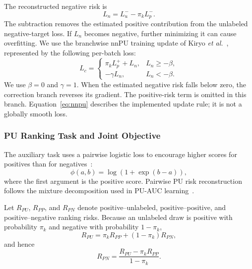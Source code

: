 \documentclass[lettersize,journal]{IEEEtran}
\begin{document}
The reconstructed negative risk is
\begin{equation}
L_n=L_u^- -\pi_kL_p^-.
\label{eq:negative-risk}
\end{equation}
The subtraction removes the estimated positive contribution from the unlabeled negative-target loss. If $L_n$ becomes negative, further minimizing it can cause overfitting. We use the branchwise nnPU training update of Kiryo \emph{et al.}~\cite{ref_nnpu}, represented by the following per-batch loss:
\begin{equation}
L_c=
\begin{cases}
\pi_kL_p^+ +L_n,&L_n\geq-\beta,\\
-\gamma L_n,&L_n<-\beta.
\end{cases}
\label{eq:nnpu}
\end{equation}
We use $\beta=0$ and $\gamma=1$. When the estimated negative risk falls below zero, the correction branch reverses its gradient. The positive-risk term is omitted in this branch. Equation~\eqref{eq:nnpu} describes the implemented update rule; it is not a globally smooth loss.

\subsubsection{PU Ranking Task and Joint Objective}

The auxiliary task uses a pairwise logistic loss to encourage higher scores for positives than for negatives~\cite{ref_auc_consistency}:
\begin{equation}
\phi(a,b)=\log\left(1+\exp(b-a)\right),
\label{eq:pairwise-logistic}
\end{equation}
where the first argument is the positive score. Pairwise PU risk reconstruction follows the mixture decomposition used in PU-AUC learning~\cite{ref_puauc}.

Let $R_{PU}$, $R_{PP}$, and $R_{PN}$ denote positive--unlabeled, positive--positive, and positive--negative ranking risks. Because an unlabeled draw is positive with probability $\pi_k$ and negative with probability $1-\pi_k$,
\begin{equation}
R_{PU}=\pi_kR_{PP}+(1-\pi_k)R_{PN},
\label{eq:ranking-mixture}
\end{equation}
and hence
\begin{equation}
R_{PN}=\frac{R_{PU}-\pi_kR_{PP}}{1-\pi_k}.
\label{eq:ranking-reconstruction}
\end{equation}
\end{document}
